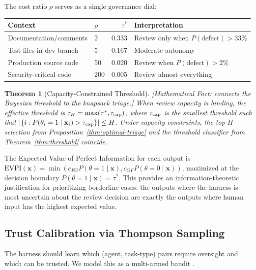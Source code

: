 \documentclass[11pt, a4paper]{googledeepmind}
\newtheorem{theorem}{Theorem}[section]
\begin{document}
The cost ratio $\rho$ serves as a single governance dial:

\begin{center}
\small
\begin{tabular}{llrl}
\toprule
\textbf{Context} & $\rho$ & $\tau^*$ & \textbf{Interpretation} \\
\midrule
Documentation/comments & 2 & 0.333 & Review only when $P(\text{defect}) > 33\%$ \\
Test files in dev branch & 5 & 0.167 & Moderate autonomy \\
Production source code & 50 & 0.020 & Review when $P(\text{defect}) > 2\%$ \\
Security-critical code & 200 & 0.005 & Review almost everything \\
\bottomrule
\end{tabular}
\end{center}

\begin{theorem}[Capacity-Constrained Threshold]
\emph{[Mathematical Fact: connects the Bayesian threshold to the knapsack triage.]}
\label{thm:capacity-threshold}
When review capacity is binding, the effective threshold is $\tau_H = \max(\tau^*, \tau_{\textup{cap}})$, where $\tau_{\textup{cap}}$ is the smallest threshold such that $|\{i : P(\theta_i = 1 \mid \mathbf{x}_i) > \tau_{\textup{cap}}\}| \leq H$. Under capacity constraints, the top-$H$ selection from Proposition~\ref{thm:optimal-triage} and the threshold classifier from Theorem~\ref{thm:threshold} coincide.
\end{theorem}

The Expected Value of Perfect Information for each output is $\text{EVPI}(\mathbf{x}) = \min(c_{FG} P(\theta=1 \mid \mathbf{x}), c_{GF} P(\theta=0 \mid \mathbf{x}))$, maximized at the decision boundary $P(\theta=1 \mid \mathbf{x}) = \tau^*$. This provides an information-theoretic justification for prioritizing borderline cases: the outputs where the harness is most uncertain about the review decision are exactly the outputs where human input has the highest expected value.

\subsection{Trust Calibration via Thompson Sampling}

The harness should learn which (agent, task-type) pairs require oversight and which can be trusted. We model this as a multi-armed bandit \citep{thompson1933likelihood}.
\end{document}
